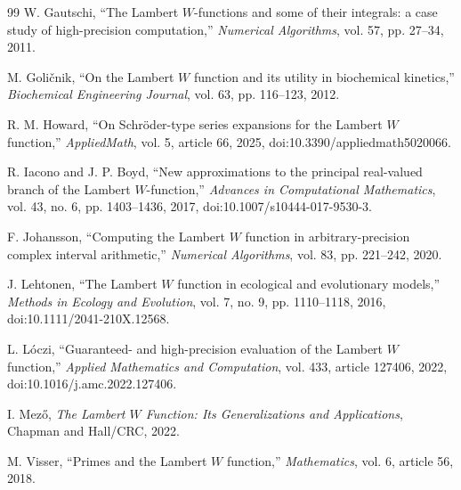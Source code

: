 \documentclass[11pt]{article}
\numberwithin{equation}{section}
\theoremstyle{definition}
\theoremstyle{remark}
\begin{document}
\begin{thebibliography}{99}
W. Gautschi,
``The Lambert $W$-functions and some of their integrals: a case study of
high-precision computation,''
\emph{Numerical Algorithms}, vol. 57, pp. 27--34, 2011.

M. Goli\v{c}nik,
``On the Lambert $W$ function and its utility in biochemical kinetics,''
\emph{Biochemical Engineering Journal}, vol. 63, pp. 116--123, 2012.

R. M. Howard,
``On Schröder-type series expansions for the Lambert $W$ function,''
\emph{AppliedMath}, vol. 5, article 66, 2025,
doi:10.3390/appliedmath5020066.

R. Iacono and J. P. Boyd,
``New approximations to the principal real-valued branch of the Lambert
$W$-function,''
\emph{Advances in Computational Mathematics}, vol. 43, no. 6,
pp. 1403--1436, 2017, doi:10.1007/s10444-017-9530-3.

F. Johansson,
``Computing the Lambert $W$ function in arbitrary-precision complex interval
arithmetic,''
\emph{Numerical Algorithms}, vol. 83, pp. 221--242, 2020.

J. Lehtonen,
``The Lambert $W$ function in ecological and evolutionary models,''
\emph{Methods in Ecology and Evolution}, vol. 7, no. 9,
pp. 1110--1118, 2016, doi:10.1111/2041-210X.12568.

L. L\'oczi,
``Guaranteed- and high-precision evaluation of the Lambert $W$ function,''
\emph{Applied Mathematics and Computation}, vol. 433, article 127406, 2022,
doi:10.1016/j.amc.2022.127406.

I. Mez\H{o},
\emph{The Lambert $W$ Function: Its Generalizations and Applications},
Chapman and Hall/CRC, 2022.

M. Visser,
``Primes and the Lambert $W$ function,''
\emph{Mathematics}, vol. 6, article 56, 2018.

\end{thebibliography}
\end{document}
